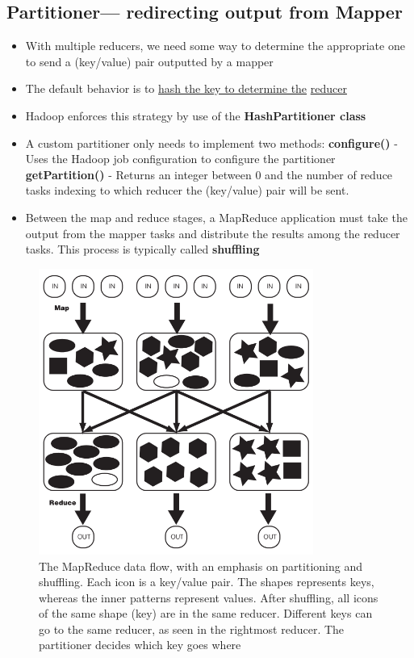\documentclass{article}
\begin{document}
\begin{multicols}{2}
\subsection {Partitioner— redirecting output from Mapper}
\begin{itemize}
\item With multiple reducers, we need some way to determine the appropriate one to send a (key/value) pair outputted by a mapper
\item The default behavior is to \underline{hash the key to determine the} \underline{reducer}
\item Hadoop enforces this strategy by use of the \textbf{HashPartitioner class}
\item A custom partitioner only needs to implement two methods: 
\subitem \textbf{configure()} -  Uses the Hadoop job configuration to configure the partitioner 
\subitem \textbf{getPartition()} - Returns an integer between 0 and the number of reduce tasks indexing to which reducer the (key/value) pair will be sent.
\item Between the map and reduce stages, a MapReduce application must take the output from the mapper tasks and distribute the results among the reducer tasks. This process is typically called \textbf{shuffling}
\end{itemize}

\begin{figure}[H]
\centering
\includegraphics[width=9cm]{assets/partitioning.png}
\caption{The MapReduce data flow, with an emphasis on partitioning and shuffling. Each icon is a key/value pair. The shapes represents keys, whereas the inner patterns represent values. After shuffling, all icons of the same shape (key) are in the same reducer. Different keys can go to the same reducer, as seen in the rightmost reducer. The partitioner decides which key goes where}
\label{fig:awesome_image}
\end{figure}


\end{multicols}
\end{document}
